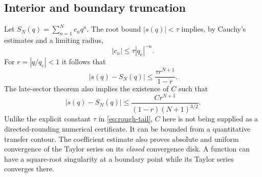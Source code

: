 \documentclass[11pt,a4paper]{article}
\numberwithin{equation}{section}
\theoremstyle{definition}
\theoremstyle{remark}
\newcommand{\qcv}{q_{\mathrm c}}
\begin{document}
\subsection{Interior and boundary truncation}
Let $S_N(q)=\sum_{n=1}^N c_nq^n$. The root bound $|s(q)|<\tau$ implies, by Cauchy's estimates and a limiting radius,
\begin{equation}
 |c_n|\leq\tau|\qcv|^{-n}.
\end{equation}
For $r=|q/\qcv|<1$ it follows that
\begin{equation}
 |s(q)-S_N(q)|\leq\frac{\tau r^{N+1}}{1-r}.
 \label{eq:rough-tail}
\end{equation}
The late-sector theorem also implies the existence of $C$ such that
\begin{equation}
 |s(q)-S_N(q)|\leq
 \frac{C r^{N+1}}{(1-r)(N+1)^{3/2}}.
 \label{eq:sharp-tail}
\end{equation}
Unlike the explicit constant $\tau$ in \eqref{eq:rough-tail}, $C$ here is not being supplied as a directed-rounding numerical certificate. It can be bounded from a quantitative transfer contour. The coefficient estimate also proves absolute and uniform convergence of the Taylor series on its \emph{closed} convergence disk. A function can have a square-root singularity at a boundary point while its Taylor series converges there.
\end{document}
